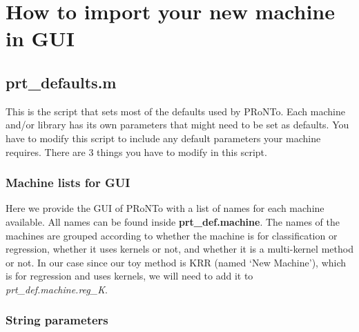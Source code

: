 % 










\section{How to import your new machine in GUI}
\label{sec:new_machine_gui}

\subsection{prt\_defaults.m}

This is the script that sets most of the defaults used by PRoNTo. Each machine and/or library has its own parameters that might need to be set as defaults. You have to modify this script to include any default parameters your machine requires. There are 3 things you have to modify in this script.

\subsubsection{Machine lists for GUI}
\label{sssec:machine_lists}

Here we provide the GUI of PRoNTo with a list of names for each machine available. All names can be found inside \textbf{prt\_def.machine}. The names of the machines are grouped according to whether the machine is for classification or regression, whether it uses kernels or not, and whether it is a multi-kernel method or not. In our case since our toy method is KRR (named `New Machine'), which is for regression and uses kernels, we will need to add it to \textit{prt\_def.machine.reg\_K}.




\subsubsection{String parameters}
\label{sssec:string_params}

